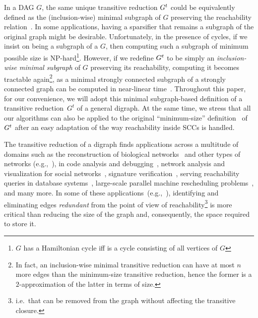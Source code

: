 \documentclass[11pt]{article}
\newcommand{\TR}[0]{\text{\( G^{t} \)}\xspace}
\begin{document}
In a DAG $G$, the same unique transitive reduction $\TR$ could be equivalently defined as the (inclusion-wise) minimal subgraph of $G$ preserving the reachability relation~\cite{Aho:1972aa}. In some applications, having a sparsifier that remains a subgraph of the original graph might be desirable.
Unfortunately, in the presence of cycles, if we insist on \TR being a subgraph of a $G$, then computing such a subgraph \TR of minimum possible size is NP-hard\footnote{$G$ has a Hamiltonian cycle iff \TR is a cycle consisting of all vertices of $G$}.
However, if we redefine $\TR$ to be simply an \emph{inclusion-wise minimal subgraph} of $G$ preserving its reachability, computing it becomes tractable again\footnote{In fact, an inclusion-wise minimal transitive reduction can have at most $n$ more edges than the minimum-size transitive reduction, hence the former is a $2$-approximation of the latter in terms of size.}, as a minimal strongly connected subgraph of a strongly connected graph can be computed in near-linear time~\cite{GibbonsKRST91, han1995computing}.
Throughout this paper, for our convenience, we will adopt this minimal subgraph-based definition of a transitive reduction~$G^t$ of a general digraph.  At the same time, we stress that all our algorithms can also be applied to the original ``minimum-size'' definition~\cite{Aho:1972aa} of $\TR$ after an easy adaptation of the way reachability inside SCCs is handled.





The transitive reduction of a digraph finds applications across a multitude of domains such as the reconstruction of biological networks~\cite{bovsnavcki2012efficient, 9460463} and other types of networks (e.g.,~\cite{pinna2013reconstruction, klamt2010transwesd, aditya2013algorithmic}), in code analysis and debugging~\cite{xu2006regulated, netzer1993optimal}, network analysis and visualization for social networks~\cite{1517831,clough2015transitive}, signature verification~\cite{HOU2015144}, serving reachability queries in database systems~\cite{jin2012scarab}, large-scale parallel machine rescheduling problems~\cite{meng2023transitive}, and many more. 
In some of these applications~(e.g.,~\cite{bovsnavcki2012efficient,9460463}), identifying and eliminating edges \emph{redundant} from the point of view of reachability\footnote{i.e.\ that can be removed from the graph without affecting the transitive closure.} is more critical than reducing the size of the graph and, consequently, the space required to store it. 
\end{document}
